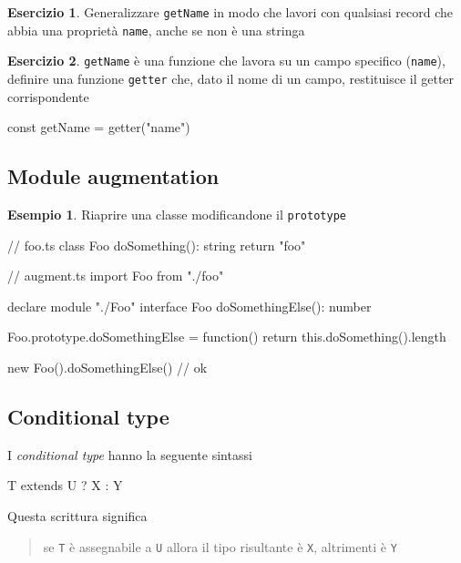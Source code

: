 \documentclass[12pt]{article}
\theoremstyle{definition}
\newtheorem{example}{Esempio}[subsection]
\newtheorem{exercise}{Esercizio}[subsection]
\newenvironment{code}
  {\vspace{0.5cm} \VerbatimEnvironment\begin{typescriptcode}}
  {\end{typescriptcode} \vspace{0.2cm}}
\begin{document}
\begin{exercise}
Generalizzare \texttt{getName} in modo che lavori con qualsiasi record che abbia una proprietà \texttt{name}, anche se non è una stringa
\end{exercise}

\begin{exercise}
\texttt{getName} è una funzione che lavora su un campo specifico (\texttt{name}), definire
una funzione \texttt{getter} che, dato il nome di un campo, restituisce il getter corrispondente

\begin{code}
const getName = getter("name")
\end{code}
\end{exercise}

\subsection{Module augmentation}

\begin{example}
Riaprire una classe modificandone il \texttt{prototype}

\begin{code}
// foo.ts
class Foo {
  doSomething(): string {
    return "foo"
  }
}

// augment.ts
import { Foo } from "./foo"

declare module "./Foo" {
  interface Foo {
    doSomethingElse(): number
  }
}

Foo.prototype.doSomethingElse = function() {
  return this.doSomething().length
}

new Foo().doSomethingElse() // ok
\end{code}
\end{example}

\subsection{Conditional type}

I \emph{conditional type} hanno la seguente sintassi

\begin{code}
T extends U ? X : Y
\end{code}

Questa scrittura significa

\begin{quote}
se \texttt{T} è assegnabile a \texttt{U} allora il tipo risultante è \texttt{X}, altrimenti è \texttt{Y}
\end{quote}
\end{document}
